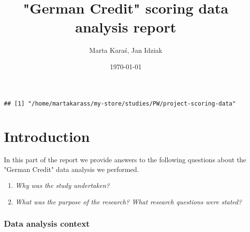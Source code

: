 \documentclass[10pt]{article}\usepackage[]{graphicx}\usepackage[]{color}
\makeatletter
\newenvironment{kframe}{%
 \def\at@end@of@kframe{}%
 \ifinner\ifhmode%
  \def\at@end@of@kframe{\end{minipage}}%
  \begin{minipage}{\columnwidth}%
 \fi\fi%
 \def\FrameCommand##1{\hskip\@totalleftmargin \hskip-\fboxsep
 \colorbox{shadecolor}{##1}\hskip-\fboxsep
     \hskip-\linewidth \hskip-\@totalleftmargin \hskip\columnwidth}%
 \MakeFramed {\advance\hsize-\width
   \@totalleftmargin\z@ \linewidth\hsize
   \@setminipage}}%
 {\par\unskip\endMakeFramed%
 \at@end@of@kframe}
\newenvironment{knitrout}{}{} %
\makeatother
\begin{document}
\title{"German Credit" scoring data analysis report}
\author{Marta Karaś, Jan Idziak}
\date{\today}
\maketitle


\newcommand{\E}{\mathbb{E}}
\newcommand{\Var}{\textnormal{Var}}
\newcommand{\bias}{\textnormal{bias}}
\newcommand{\mse}{\textnormal{MSE}}
\newcommand{\se}{\textnormal{se}}

\def\contentsname{Table of content}
\tableofcontents
\setcounter{tocdepth}{2}

\begin{knitrout}
\color{fgcolor}\begin{kframe}
\begin{verbatim}
## [1] "/home/martakarass/my-store/studies/PW/project-scoring-data"
\end{verbatim}
\end{kframe}
\end{knitrout}


\clearpage
\part{Introduction}

In this part of the report we provide answers to the following questions about the "German Credit" data analysis we performed. 
\begin{enumerate}
\item \textit{Why was the study undertaken?}
\item \textit{What was the purpose of the research? What research questions were stated?} 
\end{enumerate}



\section{Data analysis context}
\end{document}
